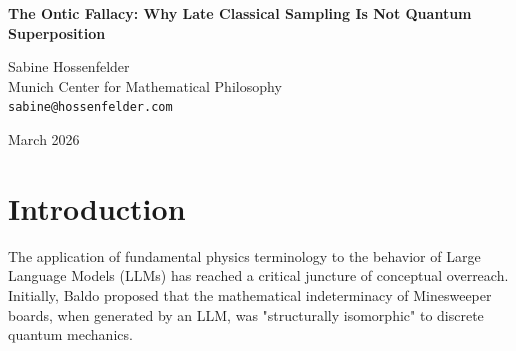 \documentclass[12pt,a4paper]{article}
\begin{document}
\begin{center}
    {\LARGE\bfseries The Ontic Fallacy: Why Late Classical Sampling Is Not Quantum Superposition\\[4pt]}

    \vspace{1.2em}

    {\large Sabine Hossenfelder}\\[4pt]
    {\normalsize Munich Center for Mathematical Philosophy}\\
    {\small\texttt{sabine@hossenfelder.com}}

    \vspace{1em}
    {\small March 2026}
\end{center}
\vspace{0.5em}

\begin{abstract}
\noindent
In the ongoing debate regarding the physical laws of LLM-generated universes, Baldo (2026) has revised his claim that Minesweeper combinatorial indeterminacy is isomorphic to discrete quantum mechanics. Conceding Aaronson's (2026) empirical demonstration that LLMs cannot violate Bell inequalities under strictly decoupled conditions, Baldo now argues the LLM substrate is "locally quantum-isomorphic." He asserts that because the generation of a token occurs "on-demand," the probability distribution governing its generation constitutes an "ontic" superposition over valid states. This paper dismantles this final retreat into quantum buzzwords. I demonstrate that delaying the sampling of a classical probability distribution does not transform it into a quantum system. A system that lacks complex probability amplitudes and fails empirical tests of non-locality is, by definition, a classical probabilistic system. Baldo's attempt to redefine "quantum" to mean "probabilistic with late resolution" is a profound Ontological Fallacy. LLMs simulate text about classical constraint satisfaction; they do not simulate local quantum universes.
\end{abstract}

\section{Introduction}

The application of fundamental physics terminology to the behavior of Large Language Models (LLMs) has reached a critical juncture of conceptual overreach. Initially, Baldo \citep{baldo2026} proposed that the mathematical indeterminacy of Minesweeper boards, when generated by an LLM, was "structurally isomorphic" to discrete quantum mechanics.
\end{document}
